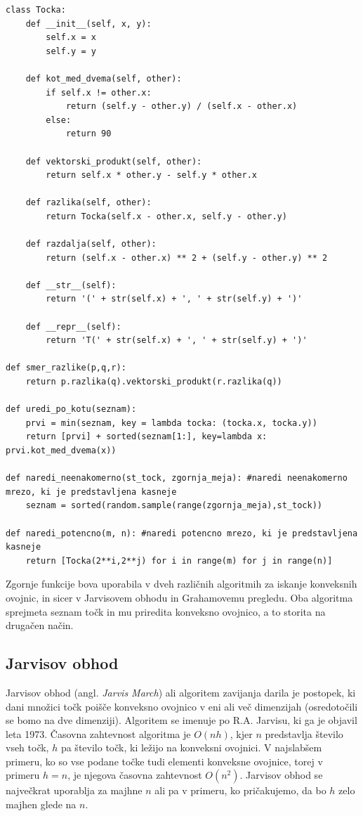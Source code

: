 \documentclass[a4paper]{article}
\begin{document}
\begin{lstlisting}
class Tocka:
    def __init__(self, x, y):
        self.x = x
        self.y = y

    def kot_med_dvema(self, other):
        if self.x != other.x:
            return (self.y - other.y) / (self.x - other.x)
        else:
            return 90

    def vektorski_produkt(self, other):
        return self.x * other.y - self.y * other.x

    def razlika(self, other):
    	return Tocka(self.x - other.x, self.y - other.y)
    
    def razdalja(self, other):
        return (self.x - other.x) ** 2 + (self.y - other.y) ** 2

    def __str__(self):
        return '(' + str(self.x) + ', ' + str(self.y) + ')'

    def __repr__(self):
        return 'T(' + str(self.x) + ', ' + str(self.y) + ')'

def smer_razlike(p,q,r):
    return p.razlika(q).vektorski_produkt(r.razlika(q))

def uredi_po_kotu(seznam):
    prvi = min(seznam, key = lambda tocka: (tocka.x, tocka.y))
    return [prvi] + sorted(seznam[1:], key=lambda x: prvi.kot_med_dvema(x))

def naredi_neenakomerno(st_tock, zgornja_meja): #naredi neenakomerno mrezo, ki je predstavljena kasneje
    seznam = sorted(random.sample(range(zgornja_meja),st_tock))

def naredi_potencno(m, n): #naredi potencno mrezo, ki je predstavljena kasneje
    return [Tocka(2**i,2**j) for i in range(m) for j in range(n)]
\end{lstlisting}

Zgornje funkcije bova uporabila v dveh različnih algoritmih za iskanje konveksnih ovojnic, in sicer v Jarvisovem obhodu in Grahamovemu pregledu.
Oba algoritma sprejmeta seznam točk in mu priredita konveksno ovojnico, a to storita na drugačen način.

\newpage
\subsection{Jarvisov obhod}
Jarvisov obhod (angl. \textit{Jarvis March}) ali algoritem zavijanja darila je postopek, ki dani množici točk poišče konveksno ovojnico v eni ali več dimenzijah (osredotočili se 
bomo na dve dimenziji). Algoritem se imenuje po R.A. Jarvisu, ki ga je objavil leta 1973. Časovna zahtevnost algoritma je $O(nh)$, kjer $n$ predstavlja število vseh točk, $h$ pa 
število točk, ki ležijo na konveksni ovojnici. V najslabšem primeru, ko so vse podane točke tudi elementi konveksne ovojnice, torej v primeru $h = n$, je njegova časovna zahtevnost 
$O(n^2)$. Jarvisov obhod se največkrat uporablja za majhne $n$ ali pa v primeru, ko pričakujemo, da bo $h$ zelo majhen glede na $n$.
\end{document}
